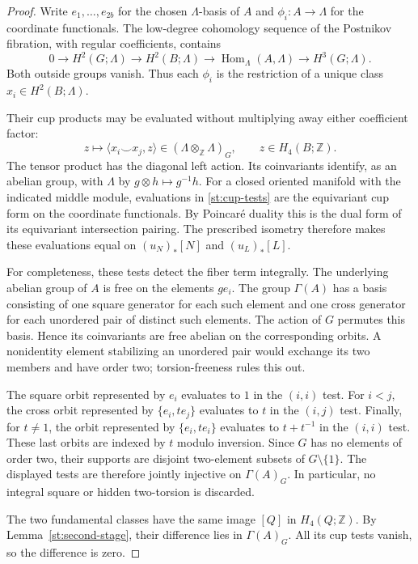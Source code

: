 \documentclass[11pt]{article}
\theoremstyle{definition}
\theoremstyle{remark}
\newcommand{\Z}{\mathbb Z}
\begin{document}
\begin{proof}
Write $e_1,\ldots,e_{2b}$ for the chosen $\Lambda$-basis of $A$ and
$\phi_i\colon A\to\Lambda$ for the coordinate functionals.  The
low-degree cohomology sequence of the Postnikov fibration, with regular
coefficients, contains
\[
 0\longrightarrow H^2(G;\Lambda)
 \longrightarrow H^2(B;\Lambda)
 \longrightarrow\operatorname{Hom}_{\Lambda}(A,\Lambda)
 \longrightarrow H^3(G;\Lambda).
\]
Both outside groups vanish.  Thus each $\phi_i$ is the restriction of
a unique class $x_i\in H^2(B;\Lambda)$.

Their cup products may be evaluated without multiplying away either
coefficient factor:
\begin{equation}\label{st:cup-tests}
 z\longmapsto
 \langle x_i\smile x_j,z\rangle
 \in(\Lambda\otimes_{\Z}\Lambda)_G,
 \qquad z\in H_4(B;\Z).
\end{equation}
The tensor product has the diagonal left action.  Its coinvariants
identify, as an abelian group, with $\Lambda$ by
$g\otimes h\mapsto g^{-1}h$.  For a closed oriented manifold with
the indicated middle module, evaluations in \eqref{st:cup-tests} are
the equivariant cup form on the coordinate functionals.  By Poincar\'e
duality this is the dual form of its equivariant intersection pairing.
The prescribed isometry therefore makes these evaluations equal on
$(u_N)_*[N]$ and $(u_L)_*[L]$.

For completeness, these tests detect the fiber term integrally.  The
underlying abelian group of $A$ is free on the elements $g e_i$.
The group $\Gamma(A)$ has a basis consisting of one square generator
for each such element and one cross generator for each unordered pair
of distinct such elements.  The action of $G$ permutes this basis.
Hence its coinvariants are free abelian on the corresponding orbits.
A nonidentity element stabilizing an unordered pair would exchange its
two members and have order two; torsion-freeness rules this out.

The square orbit represented by $e_i$ evaluates to $1$ in the $(i,i)$
test.  For $i<j$, the cross orbit represented by
$\{e_i,t e_j\}$ evaluates to $t$ in the $(i,j)$ test.  Finally, for
$t\ne1$, the orbit represented by $\{e_i,t e_i\}$ evaluates to
$t+t^{-1}$ in the $(i,i)$ test.  These last orbits are indexed by $t$
modulo inversion.  Since $G$ has no elements of order two, their supports
are disjoint two-element subsets of $G\setminus\{1\}$.  The displayed
tests are therefore jointly injective on $\Gamma(A)_G$.  In particular,
no integral square or hidden two-torsion is discarded.

The two fundamental classes have the same image $[Q]$ in $H_4(Q;\Z)$.
By Lemma~\ref{st:second-stage}, their difference lies in
$\Gamma(A)_G$.  All its cup tests vanish, so the difference is zero.
\end{proof}
\end{document}
